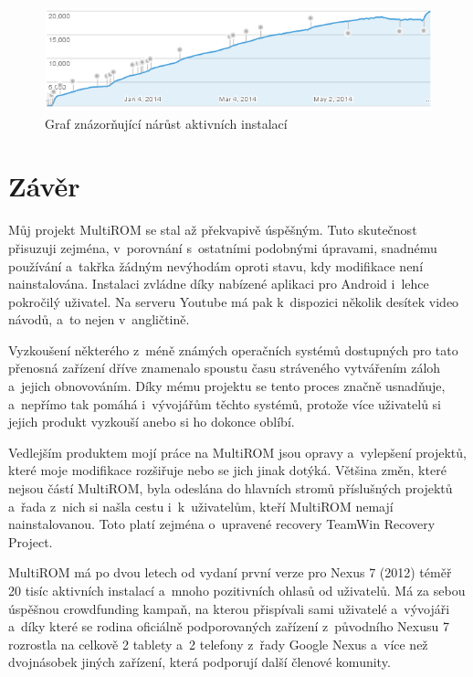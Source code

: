 \documentclass[12pt, a4paper, oneside]{article}
\begin{document}
\begin{figure}[H]
\begin{center}
 \includegraphics[width=\textwidth]{../img/graph_active_hlavicky.png}
\caption{Graf znázorňující nárůst aktivních instalací}
\label{graf-uzivatele}
\end{center}
\end{figure}

\newpage
\section*{Závěr}
Můj projekt MultiROM se stal až překvapivě úspěšným. Tuto skutečnost přisuzuji zejména, v~porovnání s~ostatními podobnými úpravami, snadnému používání a~takřka žádným nevýhodám oproti stavu, kdy modifikace není nainstalována. Instalaci zvládne díky nabízené aplikaci pro Android i~lehce pokročilý uživatel. Na serveru Youtube má pak k~dispozici několik desítek video návodů, a~to nejen v~angličtině.

Vyzkoušení některého z~méně známých operačních systémů dostupných pro tato přenosná zařízení dříve znamenalo spoustu času stráveného vytvářením záloh a~jejich obnovováním. Díky mému projektu se tento proces značně usnadňuje, a~nepřímo tak pomáhá i~vývojářům těchto systémů, protože více uživatelů si jejich produkt vyzkouší anebo si ho dokonce oblíbí.

Vedlejším produktem mojí práce na MultiROM jsou opravy a~vylepšení projektů, které moje modifikace rozšiřuje nebo se jich jinak dotýká. Většina změn, které nejsou částí MultiROM, byla odeslána do hlavních stromů příslušných projektů a~řada z~nich si našla cestu i~k~uživatelům, kteří MultiROM nemají nainstalovanou. Toto platí zejména o~upravené recovery TeamWin Recovery Project.

MultiROM má po dvou letech od vydaní první verze pro Nexus 7 (2012) téměř 20 tisíc aktivních instalací a~mnoho pozitivních ohlasů od uživatelů. Má za sebou úspěšnou crowdfunding kampaň, na kterou přispívali sami uživatelé a~vývojáři a~díky které se rodina oficiálně podporovaných zařízení z~původního Nexusu 7 rozrostla na celkově 2 tablety a~2 telefony z~řady Google Nexus a~více než dvojnásobek jiných zařízení, která podporují další členové komunity.
\end{document}
